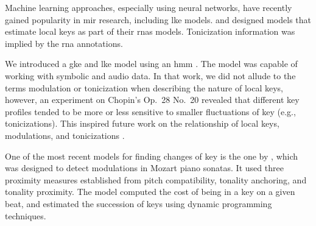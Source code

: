 Machine learning approaches, especially using neural
networks, have recently gained popularity in \gls{mir}
research, including \gls{lke} models.
\textcite{chen2018functional, chen2019harmony} and
\textcite{micchi2020not} designed models that estimate local
keys as part of their \glspl{rna} models. Tonicization
information was implied by the \gls{rna} annotations.

We introduced a \gls{gke} and \gls{lke} model using an
\gls{hmm} \parencite{napoleslopez2019keyfinding}. The model
was capable of working with symbolic and audio data. In that
work, we did not allude to the terms modulation or
tonicization when describing the nature of local keys,
however, an experiment on Chopin's Op.~28 No.~20 revealed
that different key profiles tended to be more or less
sensitive to smaller fluctuations of key (e.g.,
tonicizations). This inspired future work on the
relationship of local keys, modulations, and tonicizations
\parencite{napoleslopez2020local}.

One of the most recent models for finding changes of key is
the one by \textcite{feisthauer2020estimating}, which was
designed to detect modulations in Mozart piano sonatas. It
used three proximity measures established from pitch
compatibility, tonality anchoring, and tonality proximity.
The model computed the cost of being in a key on a given
beat, and estimated the succession of keys using dynamic
programming techniques.

